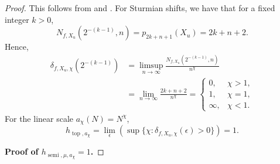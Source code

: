 \documentclass[oneside]{amsart}
\theoremstyle{plain}
\theoremstyle{definition}
\newcommand{\<}{\langle}
\renewcommand{\>}{\rangle}
\newcommand{\e}{\epsilon}
\newcommand{\topo}{\operatorname{top}}
\renewcommand{\|}{|\!|} %
\newcommand{\semitop}{\operatorname{semi}} %
\begin{document}
\begin{proof}
This follows from  and . For Sturmian shifts, we have that for a fixed integer $k > 0$, 
\begin{equation*}
    N_{f,X_u}(2^{-(k-1)},n) = p_{2k+n+1}(X_u) =2k+n+2.
\end{equation*}
Hence,
\begin{equation*}
\begin{split}
    \delta_{f,X_u,\chi}(2^{-(k-1)}) &= 
    \limsup_{n \to \infty} \frac{N_{f,X_u}(2^{-(k-1)},n)}{n^\chi}\\
    &= \lim_{n\to \infty}\frac{2k+n+2}{n^\chi}=\left\{\begin{array}{cc}
         0, & \chi >1, \\
         1, & \chi =1, \\
         \infty, & \chi <1.
    \end{array}\right.
\end{split}
\end{equation*}
For the linear scale $a_\chi(N) = N^\chi$,
\begin{equation*}
h_{\topo,a_\chi} = \lim_{\e}(\sup\{\chi:\delta_{f,X_u,\chi}(\e)>0\}) = 1.
\end{equation*}

{\bf  Proof of $h_{\semitop,\mu,a_\chi}=1$.}


\end{proof}
\end{document}

